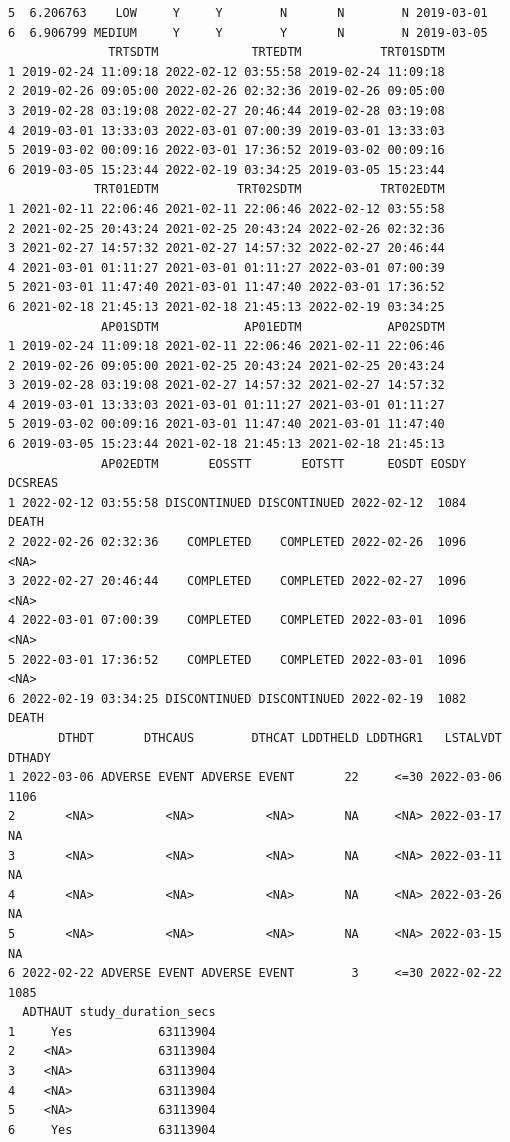 \documentclass[
  letterpaper,
  DIV=11,
  numbers=noendperiod]{scrreprt}
\begin{document}
\begin{tcolorbox}[enhanced jigsaw, leftrule=.75mm, arc=.35mm, colback=white, colframe=quarto-callout-note-color-frame, opacityback=0, toprule=.15mm, bottomrule=.15mm, rightrule=.15mm, left=2mm, breakable]
\begin{minipage}[t]{\textwidth - 5.5mm}
\begin{verbatim}
5  6.206763    LOW     Y     Y        N       N        N 2019-03-01
6  6.906799 MEDIUM     Y     Y        Y       N        N 2019-03-05
              TRTSDTM             TRTEDTM           TRT01SDTM
1 2019-02-24 11:09:18 2022-02-12 03:55:58 2019-02-24 11:09:18
2 2019-02-26 09:05:00 2022-02-26 02:32:36 2019-02-26 09:05:00
3 2019-02-28 03:19:08 2022-02-27 20:46:44 2019-02-28 03:19:08
4 2019-03-01 13:33:03 2022-03-01 07:00:39 2019-03-01 13:33:03
5 2019-03-02 00:09:16 2022-03-01 17:36:52 2019-03-02 00:09:16
6 2019-03-05 15:23:44 2022-02-19 03:34:25 2019-03-05 15:23:44
            TRT01EDTM           TRT02SDTM           TRT02EDTM
1 2021-02-11 22:06:46 2021-02-11 22:06:46 2022-02-12 03:55:58
2 2021-02-25 20:43:24 2021-02-25 20:43:24 2022-02-26 02:32:36
3 2021-02-27 14:57:32 2021-02-27 14:57:32 2022-02-27 20:46:44
4 2021-03-01 01:11:27 2021-03-01 01:11:27 2022-03-01 07:00:39
5 2021-03-01 11:47:40 2021-03-01 11:47:40 2022-03-01 17:36:52
6 2021-02-18 21:45:13 2021-02-18 21:45:13 2022-02-19 03:34:25
             AP01SDTM            AP01EDTM            AP02SDTM
1 2019-02-24 11:09:18 2021-02-11 22:06:46 2021-02-11 22:06:46
2 2019-02-26 09:05:00 2021-02-25 20:43:24 2021-02-25 20:43:24
3 2019-02-28 03:19:08 2021-02-27 14:57:32 2021-02-27 14:57:32
4 2019-03-01 13:33:03 2021-03-01 01:11:27 2021-03-01 01:11:27
5 2019-03-02 00:09:16 2021-03-01 11:47:40 2021-03-01 11:47:40
6 2019-03-05 15:23:44 2021-02-18 21:45:13 2021-02-18 21:45:13
             AP02EDTM       EOSSTT       EOTSTT      EOSDT EOSDY DCSREAS
1 2022-02-12 03:55:58 DISCONTINUED DISCONTINUED 2022-02-12  1084   DEATH
2 2022-02-26 02:32:36    COMPLETED    COMPLETED 2022-02-26  1096    <NA>
3 2022-02-27 20:46:44    COMPLETED    COMPLETED 2022-02-27  1096    <NA>
4 2022-03-01 07:00:39    COMPLETED    COMPLETED 2022-03-01  1096    <NA>
5 2022-03-01 17:36:52    COMPLETED    COMPLETED 2022-03-01  1096    <NA>
6 2022-02-19 03:34:25 DISCONTINUED DISCONTINUED 2022-02-19  1082   DEATH
       DTHDT       DTHCAUS        DTHCAT LDDTHELD LDDTHGR1   LSTALVDT DTHADY
1 2022-03-06 ADVERSE EVENT ADVERSE EVENT       22     <=30 2022-03-06   1106
2       <NA>          <NA>          <NA>       NA     <NA> 2022-03-17     NA
3       <NA>          <NA>          <NA>       NA     <NA> 2022-03-11     NA
4       <NA>          <NA>          <NA>       NA     <NA> 2022-03-26     NA
5       <NA>          <NA>          <NA>       NA     <NA> 2022-03-15     NA
6 2022-02-22 ADVERSE EVENT ADVERSE EVENT        3     <=30 2022-02-22   1085
  ADTHAUT study_duration_secs
1     Yes            63113904
2    <NA>            63113904
3    <NA>            63113904
4    <NA>            63113904
5    <NA>            63113904
6     Yes            63113904


\end{verbatim}
\end{minipage}
\end{tcolorbox}
\end{document}
